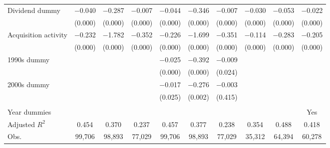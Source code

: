{\begin{longtable}{l*{9}{c}}
\addlinespace
Dividend dummy      &    $-$0.040&    $-$0.287&    $-$0.007&    $-$0.044&    $-$0.346&    $-$0.007&    $-$0.030&    $-$0.053&    $-$0.022\\
                    &     (0.000)&     (0.000)&     (0.000)&     (0.000)&     (0.000)&     (0.000)&     (0.000)&     (0.000)&     (0.000)\\
\addlinespace
Acquisition activity&    $-$0.232&    $-$1.782&    $-$0.352&    $-$0.226&    $-$1.699&    $-$0.351&    $-$0.114&    $-$0.283&    $-$0.205\\
                    &     (0.000)&     (0.000)&     (0.000)&     (0.000)&     (0.000)&     (0.000)&     (0.000)&     (0.000)&     (0.000)\\
\addlinespace
1990s dummy         &            &            &            &    $-$0.025&    $-$0.392&    $-$0.009&            &            &            \\
                    &            &            &            &     (0.000)&     (0.000)&     (0.024)&            &            &            \\
\addlinespace
2000s dummy         &            &            &            &    $-$0.017&    $-$0.276&    $-$0.003&            &            &            \\
                    &            &            &            &     (0.025)&     (0.002)&     (0.415)&            &            &            \\
\\
Year dummies        &            &            &            &            &            &            &            &            &         Yes\\
Adjusted $ R^2$     &       0.454&       0.370&       0.237&       0.457&       0.377&       0.238&       0.354&       0.488&       0.418\\
Obs.                &      99,706&      98,893&      77,029&      99,706&      98,893&      77,029&      35,312&      64,394&      60,278\\
\bottomrule
\end{longtable}
}
